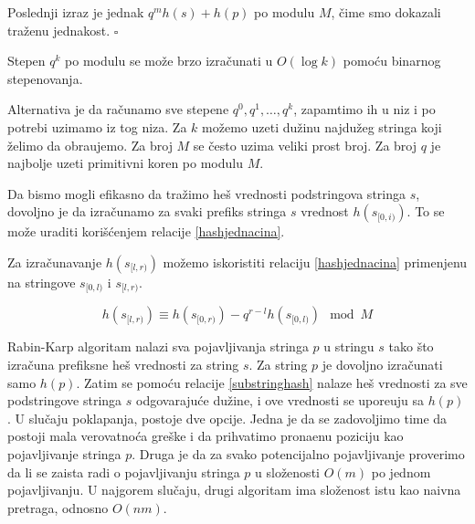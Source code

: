 Poslednji izraz je jednak $q^m h(s) + h(p)$ po modulu $M$, \v cime smo dokazali tra\v zenu jednakost. \hfill $\square$

Stepen $q^k$ po modulu se mo\v ze brzo izra\v cunati u $O(\log k)$ pomo\' cu binarnog stepenovanja.

\noindent
\begin{minipage}[l]{\textwidth}

\end{minipage}

Alternativa je da ra\v cunamo sve stepene $q^0, q^1, \ldots, q^k$, zapamtimo ih u niz i po potrebi uzimamo iz tog niza. Za $k$ mo\v zemo uzeti du\v zinu najdu\v zeg stringa koji \v zelimo da obra\dj ujemo. Za broj $M$ se \v cesto uzima veliki prost broj. Za broj $q$ je najbolje uzeti primitivni koren po modulu $M$.

\noindent
\begin{minipage}[l]{\textwidth}

\end{minipage}

Da bismo mogli efikasno da tra\v zimo he\v s vrednosti podstringova stringa $s$, dovoljno je da izra\v cunamo za svaki prefiks stringa $s$ vrednost $h(s_{[0,i)})$. To se mo\v ze uraditi kori\v s\' cenjem relacije \ref{hashjednacina}.

\noindent
\begin{minipage}[l]{\textwidth}

\end{minipage}

Za izra\v cunavanje $h(s_{[l, r)})$ mo\v zemo iskoristiti relaciju \ref{hashjednacina} primenjenu na stringove $s_{[0,l)}$ i $s_{[l,r)}$.

\begin{equation}
\label{substringhash}
    h(s_{[l, r)}) \equiv h(s_{[0, r)}) - q^{r-l}h(s_{[0, l)}) \mod M
\end{equation}

Rabin-Karp algoritam nalazi sva pojavljivanja stringa $p$ u stringu $s$ tako \v sto izra\v cuna prefiksne he\v s vrednosti za string $s$. Za string $p$ je dovoljno izra\v cunati samo $h(p)$. Zatim se pomo\' cu relacije \ref{substringhash} nalaze he\v s vrednosti za sve podstringove stringa $s$ odgovaraju\' ce du\v zine, i ove vrednosti se upore\dj uju sa $h(p)$. U slu\v caju poklapanja, postoje dve opcije. Jedna je da se zadovoljimo time da postoji mala verovatno\' ca gre\v ske i da prihvatimo prona\dj enu poziciju kao pojavljivanje stringa $p$. Druga je da za svako potencijalno pojavljivanje proverimo da li se zaista radi o pojavljivanju stringa $p$ u slo\v zenosti $O(m)$ po jednom pojavljivanju. U najgorem slu\v caju, drugi algoritam ima slo\v zenost istu kao naivna pretraga, odnosno $O(nm)$.


